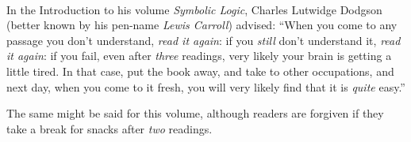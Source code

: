 \clearpage
\thispagestyle{plain}
\onecolumn
\ 
\vfill

\parbox{3 in}{
In the Introduction to his volume \emph{Symbolic Logic}, Charles Lutwidge Dodgson (better known by his pen-name \emph{Lewis Carroll}) advised: ``When you come to any passage you don't understand, \emph{read it again}: if you \emph{still} don't understand it, \emph{read it again}: if you fail, even after \emph{three} readings, very likely your brain is getting a little tired. In that case, put the book away, and take to other occupations, and next day, when you come to it fresh, you will very likely find that it is \emph{quite} easy.''

\medskip

The same might be said for this volume, although readers are forgiven if they take a break for snacks after \emph{two} readings.
}

\vfill

\parbox{3 in}{

}
\vfill
